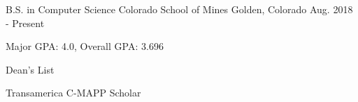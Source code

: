 


\begin{cventries}

  \cventry
    {B.S. in Computer Science} %
    {Colorado School of Mines} %
    {Golden, Colorado} %
    {Aug. 2018 - Present} %
    {
      \begin{cvitems} %
        \item{Major GPA: 4.0, Overall GPA: 3.696}
        \item{Dean's List}
        \item{Transamerica C-MAPP Scholar}
      \end{cvitems}
    }

\end{cventries}
